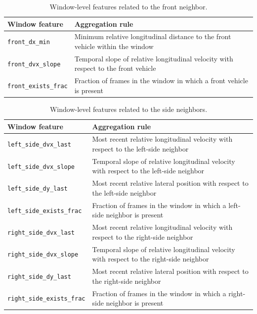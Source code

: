 \begin{table}[H]
    \centering
    \footnotesize
    \caption{Window-level features related to the front neighbor.}
    \label{tab:appendix_front_neighbor_features}
    \begin{tabularx}{\textwidth}{@{}p{4.2cm}X@{}}
        \toprule
        \textbf{Window feature} & \textbf{Aggregation rule} \\
        \midrule
        \texttt{front\_dx\_min} & Minimum relative longitudinal distance to the front vehicle within the window \\
        \texttt{front\_dvx\_slope} & Temporal slope of relative longitudinal velocity with respect to the front vehicle \\
        \texttt{front\_exists\_frac} & Fraction of frames in the window in which a front vehicle is present \\
        \bottomrule
    \end{tabularx}
\end{table}

\begin{table}[H]
    \centering
    \footnotesize
    \caption{Window-level features related to the side neighbors.}
    \label{tab:appendix_side_neighbor_features}
    \begin{tabularx}{\textwidth}{@{}p{4.2cm}X@{}}
        \toprule
        \textbf{Window feature} & \textbf{Aggregation rule} \\
        \midrule
        \texttt{left\_side\_dvx\_last} & Most recent relative longitudinal velocity with respect to the left-side neighbor \\
        \texttt{left\_side\_dvx\_slope} & Temporal slope of relative longitudinal velocity with respect to the left-side neighbor \\
        \texttt{left\_side\_dy\_last} & Most recent relative lateral position with respect to the left-side neighbor \\
        \texttt{left\_side\_exists\_frac} & Fraction of frames in the window in which a left-side neighbor is present \\
        \texttt{right\_side\_dvx\_last} & Most recent relative longitudinal velocity with respect to the right-side neighbor \\
        \texttt{right\_side\_dvx\_slope} & Temporal slope of relative longitudinal velocity with respect to the right-side neighbor \\
        \texttt{right\_side\_dy\_last} & Most recent relative lateral position with respect to the right-side neighbor \\
        \texttt{right\_side\_exists\_frac} & Fraction of frames in the window in which a right-side neighbor is present \\
        \bottomrule
    \end{tabularx}
\end{table}

